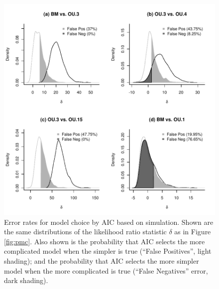 \begin{figure}
\begin{center}
    \includegraphics[width=5in]{../pmc/boettiger_figure5_bw.pdf}
\end{center}
\caption{
Error rates for model choice by AIC based on simulation.
Shown are the same distributions of the likelihood ratio statistic $\delta$ as in Figure \ref{fig:pmc}.  
Also shown is
the probability that AIC selects the more complicated model when the simpler is true
(``False Positives'', light shading);
and the probability that AIC selects the more simpler model when the more complicated is true
(``False Negatives'' error, dark shading).
}
\label{fig:aic_errors}
\end{figure}

